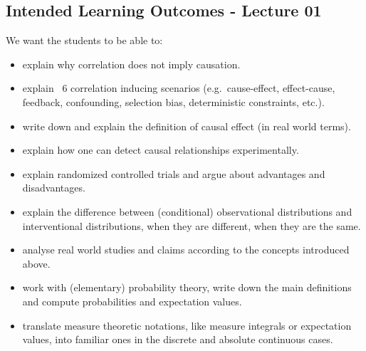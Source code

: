 \subsection*{Intended Learning Outcomes - Lecture 01}

We want the students to be able to:
\begin{itemize}
\item explain why correlation does not imply causation.
\item explain ~6 correlation inducing scenarios (e.g.\ cause-effect, effect-cause, feedback, 
    confounding, selection bias, deterministic constraints, etc.).
\item write down and explain the definition of causal effect (in real world terms).
\item explain how one can detect causal relationships experimentally.
\item explain randomized controlled trials and argue about advantages and disadvantages.
\item explain the difference between (conditional) observational distributions and interventional distributions, when they are different, when they are the same.
\item analyse real world studies and claims according to the concepts introduced above.
\item work with (elementary) probability theory, write down the main definitions and compute probabilities and expectation values.
\item translate measure theoretic notations, like measure integrals or expectation values, into familiar ones 
    in the discrete and absolute continuous cases.
\end{itemize}
